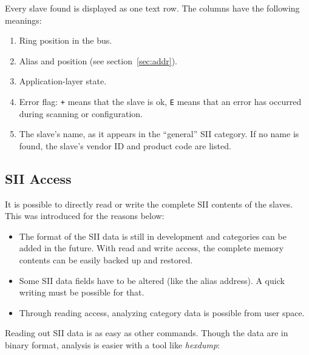 \documentclass[a4paper,12pt,BCOR6mm,bibtotoc,idxtotoc]{scrbook}
\begin{document}
Every slave found is displayed as one text row. The columns have the following
meanings:

\begin{enumerate}

\item Ring position in the bus.

\item Alias and position (see section~\ref{sec:addr}).

\item Application-layer state.

\item Error flag: \lstinline!+! means that the slave is ok, \lstinline+E+
means that an error has occurred during scanning or configuration.

\item The slave's name, as it appears in the ``general'' SII category. If no
name is found, the slave's vendor ID and product code are listed.

\end{enumerate}


\subsection{SII Access}
\label{sec:siiaccess}

It is possible to directly read or write the complete SII contents of the
slaves. This was introduced for the reasons below:

\begin{itemize}

\item The format of the SII data is still in development and categories can be
added in the future. With read and write access, the complete memory contents
can be easily backed up and restored.

\item Some SII data fields have to be altered (like the alias address). A quick
writing must be possible for that.

\item Through reading access, analyzing category data is possible from user
space.

\end{itemize}

Reading out SII data is as easy as other commands. Though the data are in
binary format, analysis is easier with a tool like \textit{hexdump}:
\end{document}
